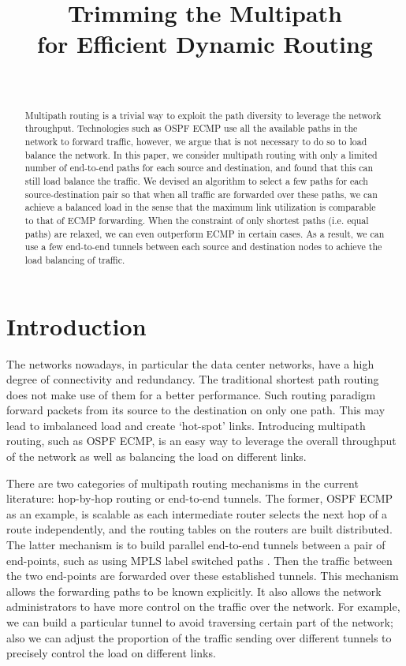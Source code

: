 \documentclass[conference]{IEEEtran}
\title{Trimming the Multipath\\ for Efficient Dynamic Routing}
\author{
\IEEEauthorblockN{Adrian S.-W. Tam \hspace{2em}
Kang Xi \hspace{2em}
H. Jonathan Chao}\\
\IEEEauthorblockA{Department of Electrical and Computer Engineering\\
Polytechnic Institute of
New York University\\
Email: adriantam@nyu.edu, kxi@poly.edu, chao@poly.edu}
}
\begin{document}
\maketitle

\begin{abstract}
Multipath routing is a trivial way to exploit the path diversity to leverage
the network throughput. Technologies such as OSPF ECMP use all the available
paths in the network to forward traffic, however, we argue that is not
necessary to do so to load balance the network. In this paper, we consider
multipath routing with only a limited number of end-to-end paths for each
source and destination, and found that this can still load balance the traffic.
We devised an algorithm to select a few paths for each source-destination pair
so that when all traffic are forwarded over these paths, we can achieve a
balanced load in the sense that the maximum link utilization is comparable to
that of ECMP forwarding. When the constraint of only shortest paths (i.e. equal
paths) are relaxed, we can even outperform ECMP in certain cases. As a result,
we can use a few end-to-end tunnels between each source and destination nodes
to achieve the load balancing of traffic.
\end{abstract}

\section{Introduction}\label{sec:intro}
The networks nowadays, in particular the data center networks, have a high
degree of connectivity and redundancy. The traditional shortest path routing
does not make use of them for a better performance. Such routing paradigm
forward packets from its source to the destination on only one path. This may
lead to imbalanced load and create `hot-spot' links. Introducing multipath
routing, such as OSPF \cite{rfc2328} ECMP, is an easy way to leverage the
overall throughput of the network as well as balancing the load on different
links.

There are two categories of multipath routing mechanisms in the current
literature: hop-by-hop routing or end-to-end tunnels. The former, OSPF ECMP as
an example, is scalable as each intermediate router selects the next hop of a
route independently, and the routing tables on the routers are built
distributed. The latter mechanism is to build parallel end-to-end tunnels
between a pair of end-points, such as using MPLS label switched paths
\cite{rfc3031}. Then the traffic between the two end-points are forwarded over
these established tunnels. This mechanism allows the forwarding paths to be
known explicitly. It also allows the network administrators to have more
control on the traffic over the network. For example, we can build a particular
tunnel to avoid traversing certain part of the network; also we can adjust the
proportion of the traffic sending over different tunnels to precisely control
the load on different links.
\end{document}
